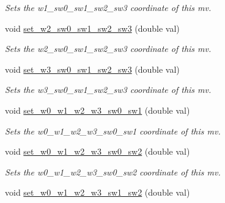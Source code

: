 \begin{DoxyCompactItemize}
\begin{DoxyCompactList}\small\item\em Sets the w1\-\_\-sw0\-\_\-sw1\-\_\-sw2\-\_\-sw3 coordinate of this mv. \end{DoxyCompactList}\item 
\hypertarget{classe3ga_1_1mv_a6e8efe64d99c3fd6c50e03c8cfc4e098}{void \hyperlink{classe3ga_1_1mv_a6e8efe64d99c3fd6c50e03c8cfc4e098}{set\-\_\-w2\-\_\-sw0\-\_\-sw1\-\_\-sw2\-\_\-sw3} (double val)}\label{classe3ga_1_1mv_a6e8efe64d99c3fd6c50e03c8cfc4e098}

\begin{DoxyCompactList}\small\item\em Sets the w2\-\_\-sw0\-\_\-sw1\-\_\-sw2\-\_\-sw3 coordinate of this mv. \end{DoxyCompactList}\item 
\hypertarget{classe3ga_1_1mv_ac5bb81d51adcb52cf27283983409ab9f}{void \hyperlink{classe3ga_1_1mv_ac5bb81d51adcb52cf27283983409ab9f}{set\-\_\-w3\-\_\-sw0\-\_\-sw1\-\_\-sw2\-\_\-sw3} (double val)}\label{classe3ga_1_1mv_ac5bb81d51adcb52cf27283983409ab9f}

\begin{DoxyCompactList}\small\item\em Sets the w3\-\_\-sw0\-\_\-sw1\-\_\-sw2\-\_\-sw3 coordinate of this mv. \end{DoxyCompactList}\item 
\hypertarget{classe3ga_1_1mv_aeea6bb081fdac3d46a0e68c309395414}{void \hyperlink{classe3ga_1_1mv_aeea6bb081fdac3d46a0e68c309395414}{set\-\_\-w0\-\_\-w1\-\_\-w2\-\_\-w3\-\_\-sw0\-\_\-sw1} (double val)}\label{classe3ga_1_1mv_aeea6bb081fdac3d46a0e68c309395414}

\begin{DoxyCompactList}\small\item\em Sets the w0\-\_\-w1\-\_\-w2\-\_\-w3\-\_\-sw0\-\_\-sw1 coordinate of this mv. \end{DoxyCompactList}\item 
\hypertarget{classe3ga_1_1mv_a041f3e12c8d2ebca269c333036646975}{void \hyperlink{classe3ga_1_1mv_a041f3e12c8d2ebca269c333036646975}{set\-\_\-w0\-\_\-w1\-\_\-w2\-\_\-w3\-\_\-sw0\-\_\-sw2} (double val)}\label{classe3ga_1_1mv_a041f3e12c8d2ebca269c333036646975}

\begin{DoxyCompactList}\small\item\em Sets the w0\-\_\-w1\-\_\-w2\-\_\-w3\-\_\-sw0\-\_\-sw2 coordinate of this mv. \end{DoxyCompactList}\item 
\hypertarget{classe3ga_1_1mv_a8c13106a1df3ba6cf1718b1235ab02a1}{void \hyperlink{classe3ga_1_1mv_a8c13106a1df3ba6cf1718b1235ab02a1}{set\-\_\-w0\-\_\-w1\-\_\-w2\-\_\-w3\-\_\-sw1\-\_\-sw2} (double val)}\label{classe3ga_1_1mv_a8c13106a1df3ba6cf1718b1235ab02a1}


\end{DoxyCompactItemize}
